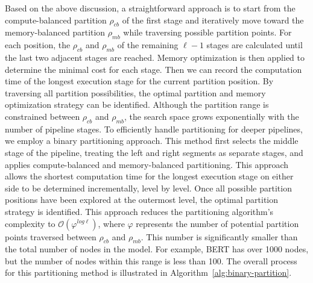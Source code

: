 Based on the above discussion,
a straightforward approach is to start from the compute-balanced partition $\rho_{cb}$ of
the first stage and iteratively move toward the memory-balanced
partition $\rho_{mb}$ while traversing possible partition points.
For each position, the $\rho_{cb}$ and $\rho_{mb}$ of the remaining $\ell - 1$ stages
are calculated until the last two adjacent stages are reached.
Memory optimization is then applied to determine the minimal cost for each stage.
Then we can record the computation time of the longest execution stage for the current partition position.
By traversing all partition possibilities, the optimal partition and memory optimization strategy can be identified.
Although the partition range is constrained between $\rho_{cb}$ and $\rho_{mb}$,
the search space grows exponentially with the number of pipeline stages.
To efficiently handle partitioning for deeper pipelines, we employ a binary partitioning approach.
This method first selects the middle stage of the pipeline,
treating the left and right segments as separate stages,
and applies compute-balanced and memory-balanced partitioning.
This approach allows the shortest computation time for the longest execution stage
on either side to be determined incrementally, level by level.
Once all possible partition positions have been explored at the outermost level,
the optimal partition strategy is identified.
This approach reduces the partitioning algorithm's complexity to $\mathcal{O}(\varphi^{log\ell})$,
where $\varphi$ represents the number of potential partition points traversed between $\rho_{cb}$ and $\rho_{mb}$.
This number is significantly smaller than the total number of nodes in the model.
For example, BERT has over 1000 nodes, but the number of nodes within this range is less than 100.
The overall process for this partitioning method is illustrated in Algorithm~\ref{alg:binary-partition}.

